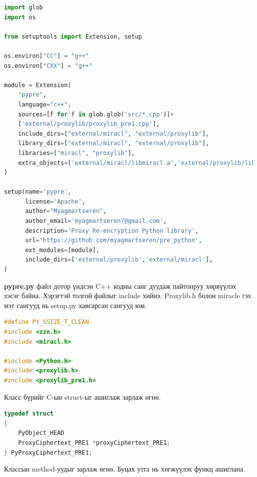 \begin{lstlisting}[language=Python, caption={setup.py}]
import glob
import os

from setuptools import Extension, setup

os.environ["CC"] = "g++"
os.environ["CXX"] = "g++"

module = Extension(
    "pypre",
    language="c++",
    sources=[f for f in glob.glob('src/*.cpp')]+
    ['external/proxylib/proxylib_pre1.cpp'],
    include_dirs=["external/miracl", "external/proxylib"],
    library_dirs=["external/miracl", "external/proxylib"],
    libraries=["miracl", "proxylib"],
    extra_objects=['external/miracl/libmiracl.a','external/proxylib/libproxylib.a']
)

setup(name='pypre',
      license='Apache',
      author="Myagmartseren",
      author_email='myagmartseren7@gmail.com',
      description='Proxy Re-encryption Python library',
      url='https://github.com/myagmartseren/pre_python',
      ext_modules=[module],
      include_dirs=['external/proxylib','external/miracl'],
)
\end{lstlisting}

\textbf{pypre.py} файл дотор үндсэн C++ кодны санг дуудаж пайтонруу хөрвүүлэх хэсэг байна. 
Хэрэгтэй толгой файлыг include хийнэ. Proxylib.h болон miracle гэх мэт сангууд нь setup.py хавсарсан сангууд юм.

\begin{lstlisting}[language=C, caption={setup.py}, captionpos=b]
#define PY_SSIZE_T_CLEAN
#include <zzn.h>
#include <miracl.h>

#include <Python.h>
#include <proxylib.h>
#include <proxylib_pre1.h>    
\end{lstlisting}

\noindent Класс бүрийг C-ын struct-ыг ашиглаж зарлаж өгнө.  

\begin{lstlisting}[language=C, caption={setup.py}]
typedef struct
{
    PyObject_HEAD
    ProxyCiphertext_PRE1 *proxyCiphertext_PRE1;
} PyProxyCiphertext_PRE1;
\end{lstlisting}

\noindent Классын method-уудыг зарлаж өгнө. Буцах утга нь хөгжүүлэх функц ашиглана.

